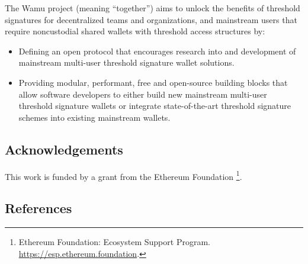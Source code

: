 \documentclass[
]{article}
\providecommand{\tightlist}{%
  \setlength{\itemsep}{0pt}\setlength{\parskip}{0pt}}
\begin{document}
The Wamu project (meaning ``together'') aims to unlock the benefits of
threshold signatures for decentralized teams and organizations, and
mainstream users that require noncustodial shared wallets with threshold
access structures by:

\begin{itemize}
\tightlist
\item
  Defining an open protocol that encourages research into and
  development of mainstream multi-user threshold signature wallet
  solutions.
\item
  Providing modular, performant, free and open-source building blocks
  that allow software developers to either build new mainstream
  multi-user threshold signature wallets or integrate state-of-the-art
  threshold signature schemes into existing mainstream wallets.
\end{itemize}

\hypertarget{acknowledgements}{%
\subsection{Acknowledgements}\label{acknowledgements}}

This work is funded by a grant from the Ethereum Foundation \footnote{Ethereum
  Foundation: Ecosystem Support Program.
  \url{https://esp.ethereum.foundation}.}.

\hypertarget{references}{%
\subsection{References}\label{references}}
\end{document}
